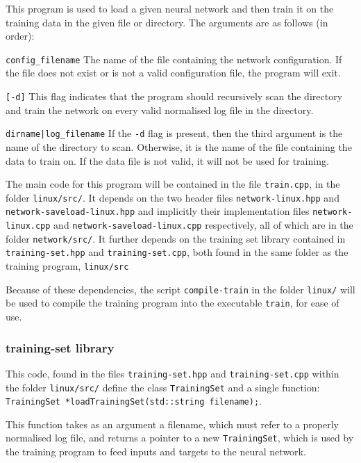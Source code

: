 \documentclass[a4paper]{article}
\begin{document}
This program is used to load a given neural network and then train it on the training data in the given file or directory. The arguments are as follows (in order):

\lstinline{config_filename} The name of the file containing the network configuration. If the file does not exist or is not a valid configuration file, the program will exit.

\lstinline{[-d]} This flag indicates that the program should recursively scan the directory and train the network on every valid normalised log file in the directory. 

\lstinline{dirname|log_filename} If the \lstinline{-d} flag is present, then the third argument is the name of the directory to scan. Otherwise, it is the name of the file containing the data to train on. If the data file is not valid, it will not be used for training.

The main code for this program will be contained in the file \lstinline{train.cpp}, in the folder \lstinline{linux/src/}. It depends on the two header files \lstinline{network-linux.hpp} and \lstinline{network-saveload-linux.hpp} and implicitly their implementation files \lstinline{network-linux.cpp} and \lstinline{network-saveload-linux.cpp} respectively, all of which are in the folder \lstinline{network/src/}. It further depends on the training set library contained in \lstinline{training-set.hpp} and \lstinline{training-set.cpp}, both found in the same folder as the training program, \lstinline{linux/src}


Because of these dependencies, the script \lstinline{compile-train} in the folder \lstinline{linux/} will be used to compile the training program into the executable \lstinline{train}, for ease of use.

\subsubsection{training-set library}

This code, found in the files \lstinline{training-set.hpp} and \lstinline{training-set.cpp} within the folder \lstinline{linux/src/} define the class \lstinline{TrainingSet} and a single function: \lstinline{TrainingSet *loadTrainingSet(std::string filename);}.

This function takes as an argument a filename, which must refer to a properly normalised log file, and returns a pointer to a new \lstinline{TrainingSet}, which is used by the training program to feed inputs and targets to the neural network.
\end{document}
